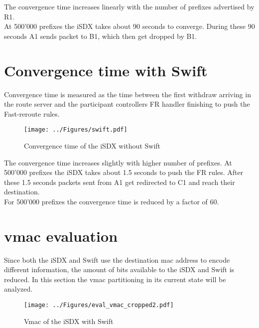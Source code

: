 \newpage

The convergence time increases linearly with the number of prefixes advertised by R1. \\
At 500'000 prefixes the iSDX takes about 90 seconds to converge. During these 90 seconds A1 sends packet to B1, which then get dropped by B1. 

\section{\label{chapter4:Convergence time with Swift}Convergence time with Swift}

Convergence time is measured as the time between the first withdraw arriving in the route server and the participant controllers FR handler finishing to push the Fast-reroute rules. \\

\begin{figure}[h]
\center
\texttt{[image: ../Figures/swift.pdf]}
\caption{Convergence time of the iSDX without Swift}
\end{figure}

The convergence time increases slightly with higher number of prefixes. At 500'000 prefixes the iSDX takes about 1.5 seconds to push the FR rules. After these 1.5 seconds packets sent from A1 get redirected to C1 and reach their destination. \\
For 500'000 prefixes the convergence time is reduced by a factor of 60.


\newpage

\section{\label{chapter4:vmac evaluation}vmac evaluation}

Since both the iSDX and Swift use the destination mac address to encode different information, the amount of bits available to  the iSDX and Swift is reduced. In this section the vmac partitioning in its current state will be analyzed.

\begin{figure}[h]
\center
\texttt{[image: ../Figures/eval\_vmac\_cropped2.pdf]}
\caption{Vmac of the iSDX with Swift}
\end{figure}


